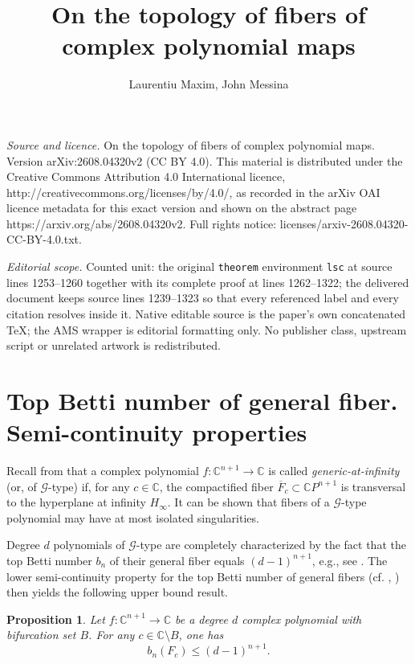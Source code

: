 \documentclass[10pt,a4paper]{amsart}
\newtheorem{proposition}[theorem]{Proposition}
\numberwithin{equation}{section}  %
\def\be{\begin{equation}}
\def\ee{\end{equation}}
\newcommand{\C}{\mathbb{C}}
\newcommand{\cG}{\mathcal{G}}
\newcommand{\oF}{\overline{F}}
\begin{document}
\title[On the topology of fibers of complex polynomial maps]{On the topology of fibers of complex polynomial maps}
\author{Laurentiu Maxim, John Messina}
\date{}
\maketitle
\noindent\emph{Source and licence.} On the topology of fibers of complex polynomial maps. Version arXiv:2608.04320v2 (CC BY 4.0). This material is distributed under the Creative Commons Attribution 4.0 International licence, http://creativecommons.org/licenses/by/4.0/, as recorded in the arXiv OAI licence metadata for this exact version and shown on the abstract page https://arxiv.org/abs/2608.04320v2. Full rights notice: licenses/arxiv-2608.04320-CC-BY-4.0.txt.\par\smallskip
\noindent\textit{Editorial scope.} Counted unit: the original \texttt{theorem} environment \texttt{lsc} at source lines 1253--1260 together with its complete proof at lines 1262--1322; the delivered document keeps source lines 1239--1323 so that every referenced label and every citation resolves inside it. Native editable source is the paper's own concatenated TeX; the AMS wrapper is editorial formatting only. No publisher class, upstream script or unrelated artwork is redistributed.
\section{Top Betti number of general fiber. Semi-continuity properties}\label{top}
Recall from \cite{T2} that a complex polynomial $f\colon\C^{n+1} \to \C$ is called {\it generic-at-infinity} (or, of $\mathcal{G}$-type) if, for any $c\in \C$, the compactified fiber $\oF_c \subset \C P^{n+1}$ is transversal to the hyperplane at infinity $H_\infty$. It can be shown that fibers of a $\cG$-type polynomial may have at most isolated singularities. %

Degree $d$ polynomials of $\cG$-type are completely characterized by the fact that the top Betti number $b_n$ of their general fiber equals $(d-1)^{n+1}$, e.g., see  \cite[Prop.4.1.5]{T2}. The lower semi-continuity property for the top Betti number of general fibers (cf. \cite[Prop.2.1]{ST1}, \cite[Prop.4.2.1]{T2}) then yields the following upper bound result.

\begin{proposition}\label{pr61}
Let $f:\C^{n+1} \to \C$ be a degree $d$ complex polynomial with bifurcation set $B$. For any $c \in \C \setminus B$, one has
\be\label{tb}
b_n(F_c)\leq (d-1)^{n+1}.
\ee
\end{proposition}
\end{document}

